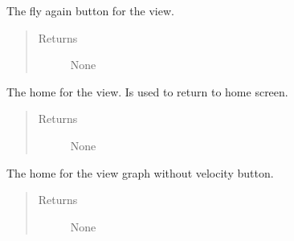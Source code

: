 \documentclass[letterpaper,10pt,english]{sphinxmanual}
\begin{document}
\begin{fulllineitems}
\begin{fulllineitems}
\begin{quote}
\begin{description}
\end{description}\end{quote}

\end{fulllineitems}


\begin{fulllineitems}
\label{\detokenize{index:src.Views.View_ReportScreen.ReportWindow.BtnFlyAgain}}
The fly again button for the view.
\begin{quote}\begin{description}
\item[{Returns}] \leavevmode
None

\end{description}\end{quote}

\end{fulllineitems}


\begin{fulllineitems}
\label{\detokenize{index:src.Views.View_ReportScreen.ReportWindow.BtnHome}}
The home for the view. Is used to return to home screen.
\begin{quote}\begin{description}
\item[{Returns}] \leavevmode
None

\end{description}\end{quote}

\end{fulllineitems}


\begin{fulllineitems}
\label{\detokenize{index:src.Views.View_ReportScreen.ReportWindow.BtnViewGraphNoVelocity}}
The home for the view graph without velocity button.
\begin{quote}\begin{description}
\item[{Returns}] \leavevmode
None


\end{description}
\end{quote}
\end{fulllineitems}
\end{fulllineitems}
\end{document}

